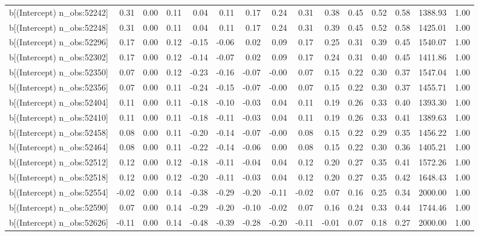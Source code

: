 \begin{table}[ht]
\begin{tabular}{rrrrrrrrrrrrrrr}
  b[(Intercept) n\_obs:52242] & 0.31 & 0.00 & 0.11 & 0.04 & 0.11 & 0.17 & 0.24 & 0.31 & 0.38 & 0.45 & 0.52 & 0.58 & 1388.93 & 1.00 \\ 
  b[(Intercept) n\_obs:52248] & 0.31 & 0.00 & 0.11 & 0.04 & 0.11 & 0.17 & 0.24 & 0.31 & 0.39 & 0.45 & 0.52 & 0.58 & 1425.01 & 1.00 \\ 
  b[(Intercept) n\_obs:52296] & 0.17 & 0.00 & 0.12 & -0.15 & -0.06 & 0.02 & 0.09 & 0.17 & 0.25 & 0.31 & 0.39 & 0.45 & 1540.07 & 1.00 \\ 
  b[(Intercept) n\_obs:52302] & 0.17 & 0.00 & 0.12 & -0.14 & -0.07 & 0.02 & 0.09 & 0.17 & 0.24 & 0.31 & 0.40 & 0.45 & 1411.86 & 1.00 \\ 
  b[(Intercept) n\_obs:52350] & 0.07 & 0.00 & 0.12 & -0.23 & -0.16 & -0.07 & -0.00 & 0.07 & 0.15 & 0.22 & 0.30 & 0.37 & 1547.04 & 1.00 \\ 
  b[(Intercept) n\_obs:52356] & 0.07 & 0.00 & 0.11 & -0.24 & -0.15 & -0.07 & -0.00 & 0.07 & 0.15 & 0.22 & 0.30 & 0.37 & 1455.71 & 1.00 \\ 
  b[(Intercept) n\_obs:52404] & 0.11 & 0.00 & 0.11 & -0.18 & -0.10 & -0.03 & 0.04 & 0.11 & 0.19 & 0.26 & 0.33 & 0.40 & 1393.30 & 1.00 \\ 
  b[(Intercept) n\_obs:52410] & 0.11 & 0.00 & 0.11 & -0.18 & -0.11 & -0.03 & 0.04 & 0.11 & 0.19 & 0.26 & 0.33 & 0.41 & 1389.63 & 1.00 \\ 
  b[(Intercept) n\_obs:52458] & 0.08 & 0.00 & 0.11 & -0.20 & -0.14 & -0.07 & -0.00 & 0.08 & 0.15 & 0.22 & 0.29 & 0.35 & 1456.22 & 1.00 \\ 
  b[(Intercept) n\_obs:52464] & 0.08 & 0.00 & 0.11 & -0.22 & -0.14 & -0.06 & 0.00 & 0.08 & 0.15 & 0.22 & 0.30 & 0.36 & 1405.21 & 1.00 \\ 
  b[(Intercept) n\_obs:52512] & 0.12 & 0.00 & 0.12 & -0.18 & -0.11 & -0.04 & 0.04 & 0.12 & 0.20 & 0.27 & 0.35 & 0.41 & 1572.26 & 1.00 \\ 
  b[(Intercept) n\_obs:52518] & 0.12 & 0.00 & 0.12 & -0.20 & -0.11 & -0.03 & 0.04 & 0.12 & 0.20 & 0.27 & 0.35 & 0.42 & 1648.43 & 1.00 \\ 
  b[(Intercept) n\_obs:52554] & -0.02 & 0.00 & 0.14 & -0.38 & -0.29 & -0.20 & -0.11 & -0.02 & 0.07 & 0.16 & 0.25 & 0.34 & 2000.00 & 1.00 \\ 
  b[(Intercept) n\_obs:52590] & 0.07 & 0.00 & 0.14 & -0.29 & -0.20 & -0.10 & -0.02 & 0.07 & 0.16 & 0.24 & 0.33 & 0.44 & 1744.46 & 1.00 \\ 
  b[(Intercept) n\_obs:52626] & -0.11 & 0.00 & 0.14 & -0.48 & -0.39 & -0.28 & -0.20 & -0.11 & -0.01 & 0.07 & 0.18 & 0.27 & 2000.00 & 1.00 \\ 

\end{tabular}
\end{table}
